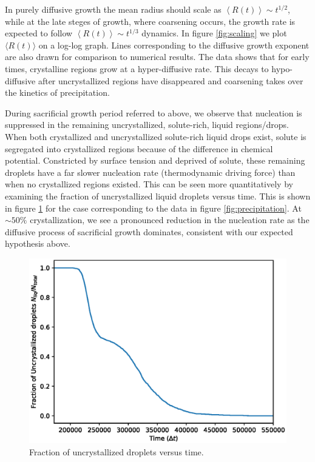 \documentclass[showkeys, prb, reprint]{revtex4-1}
\newcommand{\mean}[1]{\left\langle #1 \right\rangle}
\begin{document}
In purely diffusive growth the mean radius should scale as $\mean{R(t)} \sim
t^{1/2}$, while at the late steges of growth, where coarsening occurs, the
growth rate is expected to follow  $\mean{R(t)} \sim t^{1/3}$ dynamics.  In
figure \ref{fig:scaling} we plot $\langle R(t)\rangle$ on a log-log graph.
Lines corresponding to the diffusive growth exponent are also drawn for
comparison to numerical results. The data shows that for early times,
crystalline regions grow at a hyper-diffusive rate. 
\noindent This decays to hypo-diffusive after uncrystallized regions have disappeared and
coarsening takes over the kinetics of precipitation.


During sacrificial growth period referred to above, we observe that nucleation
is suppressed in the remaining uncrystallized, solute-rich, {\color{red} liquid regions/drops}. When both crystallized and uncrystallized solute-rich liquid drops exist, solute is segregated into crystallized regions because of the difference in chemical potential.
Constricted by surface tension and deprived of solute, these remaining droplets
have a far slower nucleation rate (thermodynamic driving force) than when no
crystallized regions existed. This can be seen more quantitatively by examining
the fraction of uncrystallized {\color{red}liquid droplets} versus time. This is shown in figure
\ref{fig:incubation} for the case corresponding to the data in figure
\ref{fig:precipitation}. At $\sim 50\%$ crystallization, we see a pronounced
reduction in the nucleation rate as the diffusive process of sacrificial growth
dominates, consistent with our expected hypothesis above.
%
\begin{figure}
    \centering
    \includegraphics[width=\columnwidth]{incubation}
    \caption[Fraction of uncrystallized droplets in time]{
        \label{fig:incubation}
        Fraction of uncrystallized droplets versus time.
    }
\end{figure}
\end{document}
